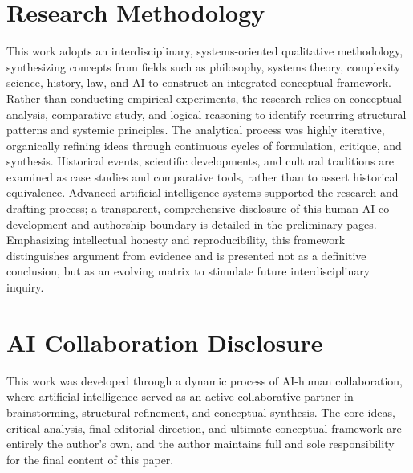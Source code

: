 \section*{Research Methodology}

This work adopts an interdisciplinary, systems-oriented qualitative methodology, synthesizing concepts from fields such as philosophy, systems theory, complexity science, history, law, and AI to construct an integrated conceptual framework. Rather than conducting empirical experiments, the research relies on conceptual analysis, comparative study, and logical reasoning to identify recurring structural patterns and systemic principles. The analytical process was highly iterative, organically refining ideas through continuous cycles of formulation, critique, and synthesis. Historical events, scientific developments, and cultural traditions are examined as case studies and comparative tools, rather than to assert historical equivalence. Advanced artificial intelligence systems supported the research and drafting process; a transparent, comprehensive disclosure of this human-AI co-development and authorship boundary is detailed in the preliminary pages. Emphasizing intellectual honesty and reproducibility, this framework distinguishes argument from evidence and is presented not as a definitive conclusion, but as an evolving matrix to stimulate future interdisciplinary inquiry.

\section*{AI Collaboration Disclosure}
This work was developed through a dynamic process of AI-human collaboration, where artificial intelligence served as an active collaborative partner in brainstorming, structural refinement, and conceptual synthesis. The core ideas, critical analysis, final editorial direction, and ultimate conceptual framework are entirely the author's own, and the author maintains full and sole responsibility for the final content of this paper.

